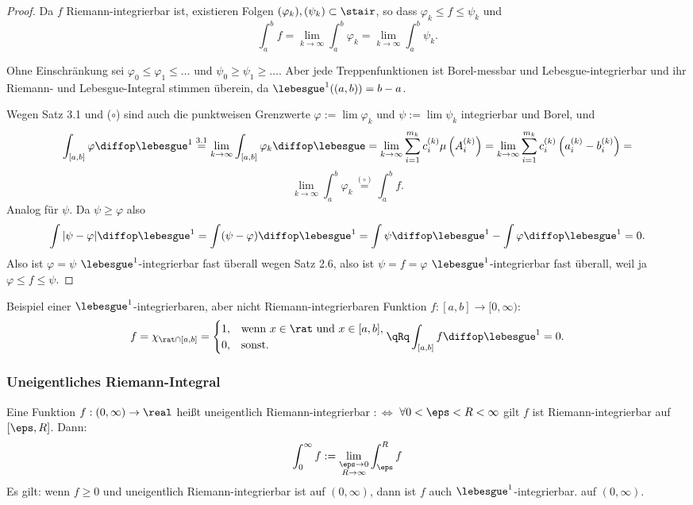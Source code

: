 \begin{proof}
 Da $f$ Riemann-integrierbar ist, existieren Folgen $(\varphi_k), (\psi_k) \subset \stair$, so dass $\varphi_k \le f \le \psi_k$ und
 \[ \int_a^b f = \lim_{k\to\infty} \int_a^b \varphi_k = \lim_{k\to\infty} \int_a^b \psi_k. \tag{$\circ$} \]

 Ohne Einschränkung sei $\varphi_0 \le \varphi_1 \le \ldots$ und $\psi_0 \ge \psi_1 \ge \ldots$. Aber jede Treppenfunktionen ist Borel-messbar und Lebesgue-integrierbar und ihr Riemann- und Lebesgue-Integral stimmen überein, da $\lebesgue^1( (a,b) ) = b - a$.

 Wegen Satz 3.1 und ($\circ$) sind auch die punktweisen Grenzwerte $\varphi := \lim \varphi_k$ und $\psi := \lim \psi_k$ integrierbar und Borel, und
 \[ \int_{[a,b]} \varphi \diffop \lebesgue^1 \stackrel{\mathrm{3.1}}= \lim_{k\to\infty} \int_{[a,b]} \varphi_k \diffop \lebesgue = \lim_{k\to\infty} \sum_{i=1}^{m_k} c_i^{(k)} \mu \left(A_i^{(k)}\right)= \lim_{k\to\infty} \sum_{i=1}^{m_k} c_i^{(k)} \left(a_i^{(k)}-b_i^{(k)}\right) = \]\[ \lim_{k\to\infty} \int_a^b \varphi_k \stackrel{({\circ})}= \int_a^b f. \]
 Analog für $\psi$. Da $\psi \ge \varphi$ also
 \[ \int | \psi - \varphi | \diffop \lebesgue^1 = \int (\psi - \varphi) \diffop \lebesgue^1 = \int \psi \diffop \lebesgue^1 - \int \varphi \diffop \lebesgue^1 = 0. \]
 Also ist $\varphi = \psi$ $\lebesgue^1$-integrierbar fast überall wegen Satz 2.6, also ist $\psi = f = \varphi$ $\lebesgue^1$-integrierbar fast überall, weil ja $\varphi \le f \le \psi$.
\end{proof}

Beispiel einer $\lebesgue^1$-integrierbaren, aber nicht Riemann-integrierbaren Funktion $f:[a,b] \to [0,\infty)$:
\[ f = \chi_{\rat \cap [a,b]} = \begin{cases} 1, &\text{wenn } x \in \rat \text{ und } x \in [a,b], \\
                                 0, &\text{sonst.}
                                \end{cases}
   \qRq \int_{[a,b]} f \diffop \lebesgue^1 = 0. \]
   
\subsubsection*{Uneigentliches Riemann-Integral}
Eine Funktion $f:(0,\infty) \to \real$ heißt uneigentlich Riemann-integrierbar $:\Leftrightarrow$ $\forall 0 < \eps < R < \infty$ gilt $f$ ist Riemann-integrierbar auf $[\eps,R]$. Dann:
\[ \int_0^\infty f := \lim_{\substack{\eps \to 0 \\ R \to \infty}} \int_\eps^R f \]
Es gilt: wenn $f \ge 0$ und uneigentlich Riemann-integrierbar ist auf $(0,\infty)$, dann ist $f$ auch $\lebesgue^1$-integrierbar. auf $(0,\infty)$.

